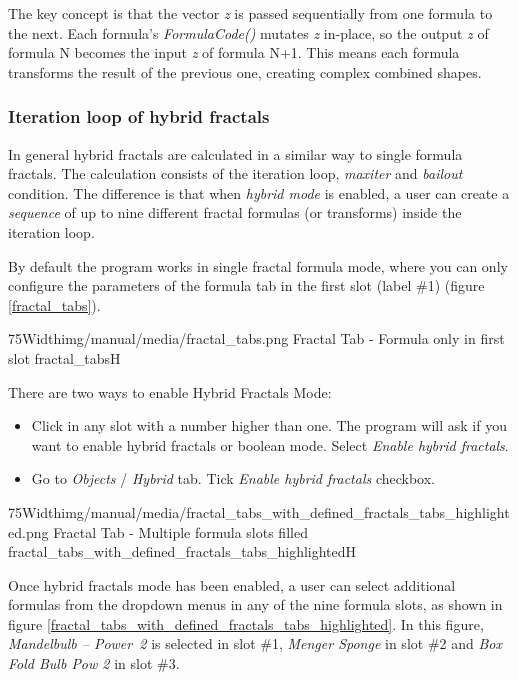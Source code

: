 The key concept is that the vector \emph{z} is passed sequentially from one formula to the next. Each formula's \emph{FormulaCode()} mutates \emph{z} in-place, so the output \emph{z} of formula N becomes the input \emph{z} of formula N+1. This means each formula transforms the result of the previous one, creating complex combined shapes.

\subsubsection{Iteration loop of hybrid fractals}

In general hybrid fractals are calculated in a similar way to single formula fractals.
The calculation consists of the iteration loop, \emph{maxiter} and \emph{bailout} condition. The
difference is that when \emph{hybrid mode} is enabled, a user can create a \emph{sequence} of up to nine different fractal formulas (or transforms) inside the iteration loop. 

By default the program works in single fractal formula mode, where you can only configure the parameters of the formula tab in the first slot (label \#1) (figure \ref{fractal_tabs}).

\simpleImageWithCaption75Width{img/manual/media/fractal_tabs.png}
{Fractal Tab - Formula only in first slot}
{fractal_tabs}{H}

There are two ways to enable Hybrid Fractals Mode:
\begin{itemize}
	\item Click in any slot with a number higher than one. The program will ask if you want to
	enable hybrid fractals or boolean mode. Select \emph{Enable hybrid fractals}.
	\item Go to \emph{Objects} / \emph{Hybrid} tab. Tick \emph{Enable hybrid fractals} checkbox.
\end{itemize}

\simpleImageWithCaption75Width{img/manual/media/fractal_tabs_with_defined_fractals_tabs_highlighted.png}
{Fractal Tab - Multiple formula slots filled}
{fractal_tabs_with_defined_fractals_tabs_highlighted}{H}

Once hybrid fractals mode has been enabled, a user can select additional formulas from the dropdown menus in any of the nine formula slots,
as shown in figure \ref{fractal_tabs_with_defined_fractals_tabs_highlighted}.
In this figure, \emph{Mandelbulb -- Power~2} is selected in slot \#1, \emph{Menger Sponge}
in slot \#2 and \emph{Box Fold Bulb Pow 2} in slot \#3.

